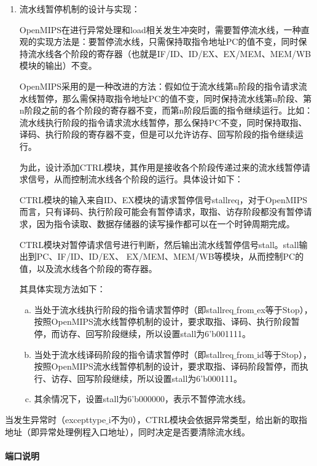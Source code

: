 \begin{enumerate}[(1)]
\item 流水线暂停机制的设计与实现：

	OpenMIPS在进行异常处理和load相关发生冲突时，需要暂停流水线，一种直观的实现方法是：要暂停流水线，只需保持取指令地址PC的值不变，同时保持流水线各个阶段的寄存器（也就是IF/ID、ID/EX、EX/MEM、MEM/WB模块的输出）不变。

	OpenMIPS采用的是一种改进的方法：假如位于流水线第n阶段的指令请求流水线暂停，那么需保持取指令地址PC的值不变，同时保持流水线第n阶段、第n阶段之前的各个阶段的寄存器不变，而第n阶段后面的指令继续运行。比如：流水线执行阶段的指令请求流水线暂停，那么保持PC不变，同时保持取指、译码、执行阶段的寄存器不变，但是可以允许访存、回写阶段的指令继续运行。

	为此，设计添加CTRL模块，其作用是接收各个阶段传递过来的流水线暂停请求信号，从而控制流水线各个阶段的运行。具体设计如下：

	CTRL模块的输入来自ID、EX模块的请求暂停信号stallreq，对于OpenMIPS而言，只有译码、执行阶段可能会有暂停请求，取指、访存阶段都没有暂停请求，因为指令读取、数据存储器的读写操作都可以在一个时钟周期完成。

	CTRL模块对暂停请求信号进行判断，然后输出流水线暂停信号stall。stall输出到PC、IF/ID、ID/EX、 EX/MEM、MEM/WB等模块，从而控制PC的值，以及流水线各个阶段的寄存器。

	其具体实现方法如下：
	\begin{enumerate}[(a)]
		\item 当处于流水线执行阶段的指令请求暂停时（即stallreq$\_$from$\_$ex等于Stop），按照OpenMIPS流水线暂停机制的设计，要求取指、译码、执行阶段暂停，而访存、回写阶段继续，所以设置stall为6'b001111。
	
		\item 当处于流水线译码阶段的指令请求暂停时（即stallreq$\_$from$\_$id等于Stop），按照OpenMIPS流水线暂停机制的设计，要求取指、译码阶段暂停，而执行、访存、回写阶段继续，所以设置stall为6'b000111。
	
		\item 其余情况下，设置stall为6'b000000，表示不暂停流水线。
	\end{enumerate}
\end{enumerate}

当发生异常时（excepttype$\_$i不为0），CTRL模块会依据异常类型，给出新的取指地址（即异常处理例程入口地址），同时决定是否要清除流水线。


\paragraph{端口说明}
\quad

